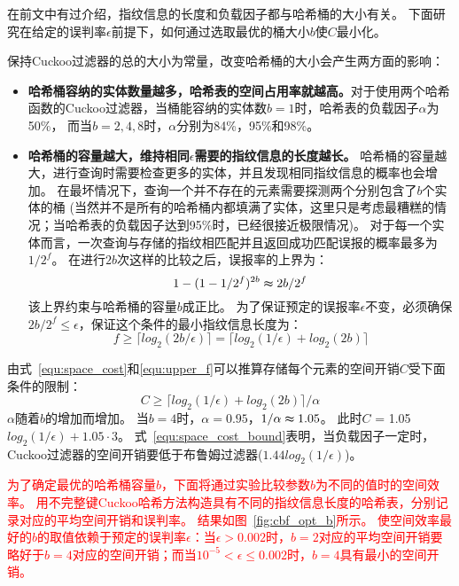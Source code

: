 在前文中有过介绍，指纹信息的长度和负载因子都与哈希桶的大小有关。
下面研究在给定的误判率$\epsilon$前提下，如何通过选取最优的桶大小$b$使$C$最小化。

保持Cuckoo过滤器的总的大小为常量，改变哈希桶的大小会产生两方面的影响：
\begin{itemize}
\item \textbf{哈希桶容纳的实体数量越多，哈希表的空间占用率就越高。}对于使用两个哈希函数的Cuckoo过滤器，当桶能容纳的实体数$b = 1$时，哈希表的负载因子$\alpha$为50\%，
而当$b = 2,4,8$时，$\alpha$分别为84\%，95\%和98\%。
\item \textbf{哈希桶的容量越大，维持相同$\epsilon$需要的指纹信息的长度越长。}
哈希桶的容量越大，进行查询时需要检查更多的实体，并且发现相同指纹信息的概率也会增加。
在最坏情况下，查询一个并不存在的元素需要探测两个分别包含了$b$个实体的桶
(当然并不是所有的哈希桶内都填满了实体，这里只是考虑最糟糕的情况；当哈希表的负载因子达到95\%时，已经很接近极限情况)。
对于每一个实体而言，一次查询与存储的指纹相匹配并且返回成功匹配误报的概率最多为${1/2^f}$。
在进行$2b$次这样的比较之后，误报率的上界为：
\begin{equation}
1 - (1 - {1/2^f})^{2b} \thickapprox {2b/2^f}
\end{equation}
该上界约束与哈希桶的容量$b$成正比。
为了保证预定的误报率$\epsilon$不变，必须确保${2b/2^f}\leq \epsilon$，保证这个条件的最小指纹信息长度为：
\begin{equation}
f \geq \lceil log_2({2b/\epsilon})\rceil = \lceil log_2({1/\epsilon}) + log_2(2b)\rceil  
\label{equ:upper_f}
\end{equation}
\end{itemize}

由式~\ref{equ:space_cost}和\ref{equ:upper_f}可以推算存储每个元素的空间开销$C$受下面条件的限制：
\begin{equation}
C \geq {\lceil log_2({1/\epsilon}) + log_2(2b)\rceil /\alpha}
\label{equ:space_cost_bound}
\end{equation}
$\alpha$随着$b$的增加而增加。
当$b = 4$时，$\alpha = 0.95$，${1/\alpha} \thickapprox 1.05$。
此时$C$ = 1.05$log_2({1/\epsilon}) + 1.05\cdot 3$。
式~\ref{equ:space_cost_bound}表明，当负载因子一定时，Cuckoo过滤器的空间开销要低于布鲁姆过滤器($1.44log_2({1/\epsilon})$)。

\textcolor{red}{为了确定最优的哈希桶容量$b$，下面将通过实验比较参数$b$为不同的值时的空间效率。
用不完整键Cuckoo哈希方法构造具有不同的指纹信息长度的哈希表，分别记录对应的平均空间开销和误判率。
结果如图~\ref{fig:cbf_opt_b}所示。
使空间效率最好的$b$的取值依赖于预定的误判率$\epsilon$：当$\epsilon > 0.002 $时，$b = 2$对应的平均空间开销要略好于$b = 4$对应的空间开销；而当$ 10^{-5} < \epsilon \leq 0.002$时，$b = 4$具有最小的空间开销。}

